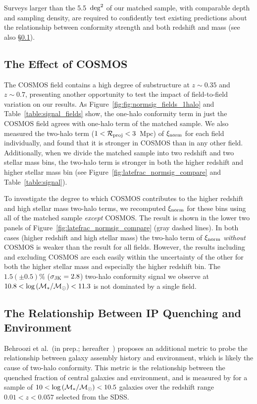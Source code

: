 Surveys larger than the 5.5~$\degsq$ of our matched sample, with comparable depth and sampling density, are required
to confidently test existing predictions about the relationship between conformity strength and both redshift and mass (see also \S\ref{sec:cosmos}).


\subsection{The Effect of COSMOS}\label{sec:cosmos}

The COSMOS field contains a high degree of substructure at $z\sim0.35$ and $z\sim0.7$, presenting another opportunity to test the impact of field-to-field variation on our results.
As Figure~\ref{fig:fig:normsig_fields_1halo} and Table~\ref{table:signal_fields} show, the one-halo conformity term in just the COSMOS field
agrees with one-halo term of the matched sample.
We also measured the two-halo term ($1<\mathcal{R}_{\text{proj}}<3$~Mpc) of $\signorm$ for each field individually, and found that it is stronger in COSMOS than in any other field.
Additionally, when we divide the matched sample into two redshift and two stellar mass bins, the two-halo term is stronger in both the higher redshift and higher stellar mass bin (see Figure~\ref{fig:latefrac_normsig_compare} and Table~\ref{table:signal}).

To investigate the degree to which COSMOS contributes to the higher redshift and high stellar mass two-halo terms, we recomputed $\signorm$ for these bins using all of the matched sample \emph{except} COSMOS.
The result is shown in the lower two panels of Figure~\ref{fig:latefrac_normsig_compare} (gray dashed lines).
In both cases (higher redshift and high stellar mass) the two-halo term of $\signorm$ \emph{without} COSMOS is weaker than the result for all fields.
However, the results including and excluding COSMOS are each easily within the uncertainty of the other for both the higher stellar mass and especially the higher redshift bin.
The $1.5(\pm0.5)\%$ ($\sigmaJK=2.8$) two-halo conformity signal we observe at ${10.8<\log\,(\mstar/\msun)<11.3}$ is not dominated by a single field.


\subsection{The Relationship Between IP Quenching and Environment}\label{sec:environment}

Behroozi et al.~(in prep.; hereafter~\citePB) proposes an additional metric to probe the relationship between galaxy assembly history and environment, which is likely the cause of two-halo conformity.
This metric is the relationship between the quenched fraction of central galaxies and environment, and is measured by \citePB for a sample of ${10<\log\,(\mstar/\msun)<10.5}$ galaxies over the redshift range ${0.01<z<0.057}$ selected from the SDSS.

